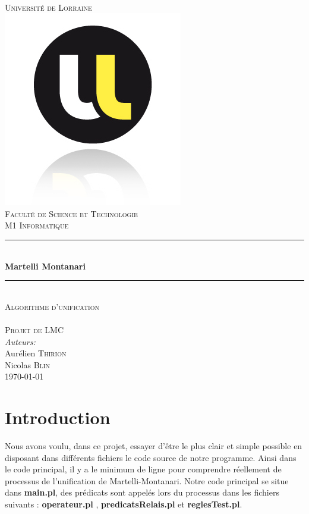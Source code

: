 \documentclass[10pt,a4paper]{report}
\newcommand{\HRule}{\rule{\linewidth}{2mm}}
\begin{document}
\begin{titlepage}
    \begin{center}
      ~\\[4cm]
      \textsc{\huge Université de Lorraine}\\[1.0cm]
      \includegraphics{univr.jpg}\\[0.5cm]
      \textsc{\Large Faculté de Science et Technologie}\\[0.5cm]
      \textsc{\Large M1 Informatique}\\[1cm]
      \HRule \\[0.4cm]
      { \huge \bfseries Martelli Montanari \\[0.4cm] }
      \HRule \\[1cm]
     \textsc{\LARGE Algorithme d'unification \\ ~ \\ Projet de LMC }\\[4cm]
	\emph{Auteurs:}\\
	Aurélien \textsc{Thirion} \\
	Nicolas \textsc{Blin}\\
      \vfill
      {\large \today}
    \end{center}
  \end{titlepage}








\chapter*{Introduction}
Nous avons voulu, dans ce projet, essayer d'être le plus clair et simple possible en
disposant dans différents fichiers le code source de notre programme. Ainsi dans le code
principal, il y a le minimum de ligne pour comprendre réellement de processus de
l'unification de Martelli-Montanari. Notre code principal se situe dans \textbf{main.pl}, des
prédicats sont appelés lors du processus dans les fichiers suivants : \textbf{operateur.pl} ,
\textbf{predicatsRelais.pl} et \textbf{reglesTest.pl}.\\[1cm]
\end{document}
